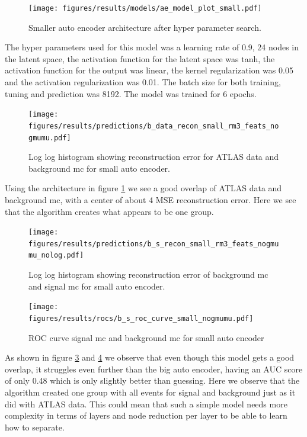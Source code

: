 \documentclass[ reprint, amsmath,amssymb, aps, nofootinbib]{revtex4-2}
\begin{document}
\begin{figure}[H]
    \centering
    \texttt{[image: figures/results/models/ae\_model\_plot\_small.pdf]}
    \caption{Smaller auto encoder architecture after hyper parameter search. }
    \label{fig:small_ae_plot}
\end{figure}

The hyper parameters used for this model was a learning rate of 0.9, 24 nodes in the latent space, the activation function for the latent space was tanh, the activation function for the output was linear, the kernel regularization was 0.05 and the activation regularization was 0.01. The batch size for both training, tuning and prediction was 8192. The model was trained for 6 epochs. 


\begin{figure}[H]
     \centering
         \texttt{[image: figures/results/predictions/b\_data\_recon\_small\_rm3\_feats\_nogmumu.pdf]}
         \caption{Log log histogram showing reconstruction error for ATLAS data and background mc for small auto encoder. }
     \label{fig:data_b_small_pred}
\end{figure}


Using the architecture in figure \ref{fig:small_ae_plot} we see a good overlap of ATLAS data and background mc, with a center of about 4 MSE reconstruction error. Here we see that the algorithm creates what appears to be one group. 

\begin{figure}[H]    
 \centering
    \texttt{[image: figures/results/predictions/b\_s\_recon\_small\_rm3\_feats\_nogmumu\_nolog.pdf]}
    \caption{Log log histogram showing reconstruction error of background mc and signal mc for small auto encoder. }
    \label{fig:s_b_small_pred_}   
  
\end{figure}

\begin{figure}[H]    
  \centering
         \texttt{[image: figures/results/rocs/b\_s\_roc\_curve\_small\_nogmumu.pdf]}
         \caption{ROC curve signal mc and background mc for small auto encoder}
         \label{fig:s_b_small_roc}  
  
\end{figure}


As shown in figure \ref{fig:s_b_small_pred_} and \ref{fig:s_b_small_roc} we observe that even though this model gets a good overlap, it struggles even further than the big auto encoder, having an AUC score of only 0.48 which is only slightly better than guessing. Here we observe that the algorithm created one group with all events for signal and background just as it did with ATLAS data. This could mean that such a simple model needs more complexity in terms of layers and node reduction per layer to be able to learn how to separate. \par 
\end{document}
